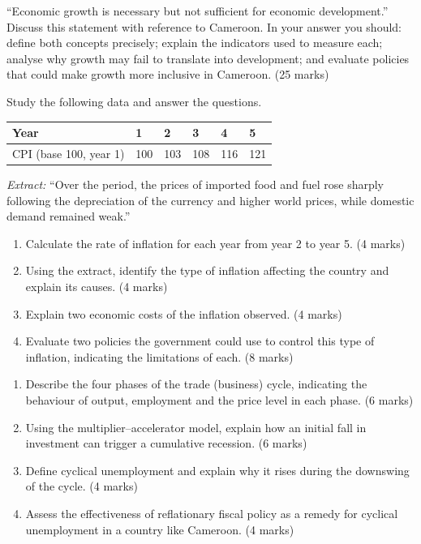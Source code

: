 \documentclass[11pt]{article}
\newcounter{popsec}
\newcounter{popsub}
\newcommand{\courssub}[1]{%
  \stepcounter{popsub}%
  \par\vspace{9pt}\noindent{\popxbold\fontsize{11.5}{13}\selectfont\color{popink}{\color{poporange}\thepopsec.\thepopsub}\hspace{6pt}#1}\par\nopagebreak\vspace{4pt}
}
\begin{document}
\courssub{I prepare for the GCE}

\begin{exercice}
``Economic growth is necessary but not sufficient for economic development.'' Discuss this statement with reference to Cameroon. In your answer you should: define both concepts precisely; explain the indicators used to measure each; analyse why growth may fail to translate into development; and evaluate policies that could make growth more inclusive in Cameroon. \hfill (25 marks)
\end{exercice}

\begin{exercice}
Study the following data and answer the questions.
\begin{center}
\begin{tabularx}{\linewidth}{|l|X|X|X|X|X|}
\hline
\rowcolor{popblueL} Year & 1 & 2 & 3 & 4 & 5 \\
\hline CPI (base 100, year 1) & 100 & 103 & 108 & 116 & 121 \\
\hline
\end{tabularx}
\end{center}
\emph{Extract:} ``Over the period, the prices of imported food and fuel rose sharply following the depreciation of the currency and higher world prices, while domestic demand remained weak.''
\begin{enumerate}
\item Calculate the rate of inflation for each year from year 2 to year 5. \hfill (4 marks)
\item Using the extract, identify the type of inflation affecting the country and explain its causes. \hfill (4 marks)
\item Explain two economic costs of the inflation observed. \hfill (4 marks)
\item Evaluate two policies the government could use to control this type of inflation, indicating the limitations of each. \hfill (8 marks)
\end{enumerate}
\end{exercice}

\begin{exercice}
\begin{enumerate}
\item Describe the four phases of the trade (business) cycle, indicating the behaviour of output, employment and the price level in each phase. \hfill (6 marks)
\item Using the multiplier--accelerator model, explain how an initial fall in investment can trigger a cumulative recession. \hfill (6 marks)
\item Define cyclical unemployment and explain why it rises during the downswing of the cycle. \hfill (4 marks)
\item Assess the effectiveness of reflationary fiscal policy as a remedy for cyclical unemployment in a country like Cameroon. \hfill (4 marks)
\end{enumerate}
\end{exercice}
\end{document}
